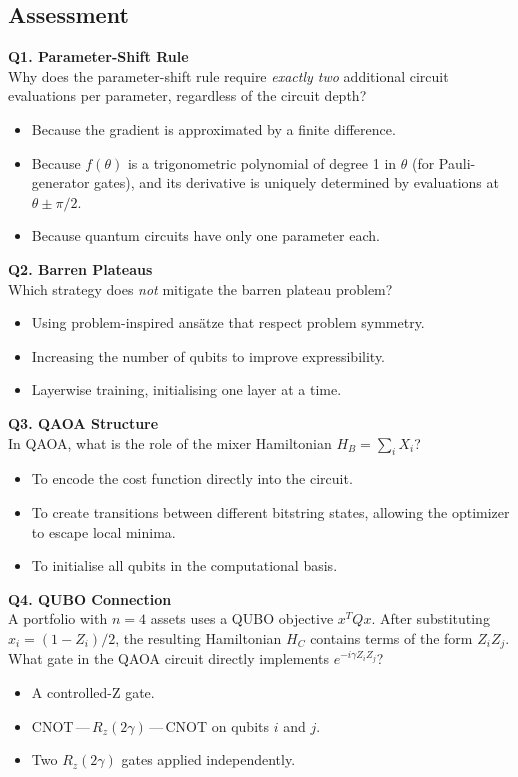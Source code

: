 \documentclass[a4paper,11pt]{article}
\begin{document}
\subsection{Assessment}

\textbf{Q1. Parameter-Shift Rule}\\
Why does the parameter-shift rule require \emph{exactly two} additional
circuit evaluations per parameter, regardless of the circuit depth?
\begin{itemize}
    \item[A)] Because the gradient is approximated by a finite difference.
    \item[B)] Because $f(\theta)$ is a trigonometric polynomial of degree 1
              in $\theta$ (for Pauli-generator gates), and its derivative
              is uniquely determined by evaluations at $\theta \pm \pi/2$.
    \item[C)] Because quantum circuits have only one parameter each.
\end{itemize}

\vspace{0.3cm}
\textbf{Q2. Barren Plateaus}\\
Which strategy does \emph{not} mitigate the barren plateau problem?
\begin{itemize}
    \item[A)] Using problem-inspired ansätze that respect problem symmetry.
    \item[B)] Increasing the number of qubits to improve expressibility.
    \item[C)] Layerwise training, initialising one layer at a time.
\end{itemize}

\vspace{0.3cm}
\textbf{Q3. QAOA Structure}\\
In QAOA, what is the role of the mixer Hamiltonian $H_B = \sum_i X_i$?
\begin{itemize}
    \item[A)] To encode the cost function directly into the circuit.
    \item[B)] To create transitions between different bitstring states,
              allowing the optimizer to escape local minima.
    \item[C)] To initialise all qubits in the computational basis.
\end{itemize}

\vspace{0.3cm}
\textbf{Q4. QUBO Connection}\\
A portfolio with $n=4$ assets uses a QUBO objective $x^T Q x$.
After substituting $x_i = (1-Z_i)/2$, the resulting Hamiltonian $H_C$
contains terms of the form $Z_iZ_j$. What gate in the QAOA circuit
directly implements $e^{-i\gamma Z_i Z_j}$?
\begin{itemize}
    \item[A)] A controlled-Z gate.
    \item[B)] CNOT\,—\,$R_z(2\gamma)$\,—\,CNOT on qubits $i$ and $j$.
    \item[C)] Two $R_z(2\gamma)$ gates applied independently.
\end{itemize}
\end{document}
